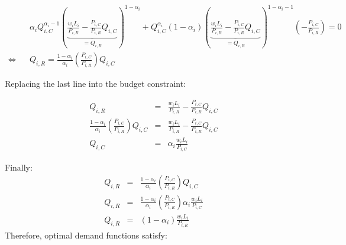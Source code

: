 \documentclass[11pt,letterpaper]{article}
\begin{document}
\scriptsize{
\begin{eqnarray*}
    & & \alpha_i Q_{i,C}^{\alpha_i-1} \left( \underbrace{\frac{w_i L_i}{P_{i,R}} - \frac{P_{i,C}}{P_{i,R} } Q_{i,C}}_{=Q_{i,R}} \right)^{1-\alpha_i} + Q_{i,C}^{\alpha_i} (1-\alpha_i) \left( \underbrace{\frac{w_i L_i}{P_{i,R}} - \frac{P_{i,C}}{P_{i,R} } Q_{i,C}}_{=Q_{i,R}} \right)^{1-\alpha_i-1} \left( - \frac{P_{i,C}}{P_{i,R}}\right) = 0 \\
\iff    & & Q_{i,R}  = \frac{1-\alpha_i}{\alpha_i } \left( \frac{P_{i,C}}{P_{i,R}}\right) Q_{i,C}
\end{eqnarray*}
}

\normalsize
Replacing the last line into the budget constraint:

\scriptsize{
\begin{eqnarray*}
    Q_{i,R}&=& \frac{w_i L_i}{P_{i,R}} - \frac{P_{i,C}}{P_{i,R} } Q_{i,C} \\
    \frac{1-\alpha_i}{\alpha_i } \left( \frac{P_{i,C}}{P_{i,R}}\right) Q_{i,C} &=& \frac{w_i L_i}{P_{i,R}} - \frac{P_{i,C}}{P_{i,R} } Q_{i,C} \\
    Q_{i,C} &=& \alpha_i  \frac{w_i L_i}{P_{i,C}}
\end{eqnarray*}

}

\normalsize
Finally:
{\scriptsize
\begin{eqnarray*}
     Q_{i,R}  &=& \frac{1-\alpha_i}{\alpha_i } \left( \frac{P_{i,C}}{P_{i,R}}\right) Q_{i,C}  \\
     Q_{i,R}  &=& \frac{1-\alpha_i}{\alpha_i } \left( \frac{P_{i,C}}{P_{i,R}}\right) \alpha_i  \frac{w_i L_i}{P_{i,C}} \\
      Q_{i,R}  &=& (1-\alpha_i) \frac{w_i L_i}{P_{i,R}}
\end{eqnarray*}
}
\normalsize
Therefore, optimal demand functions satisfy:
\end{document}
